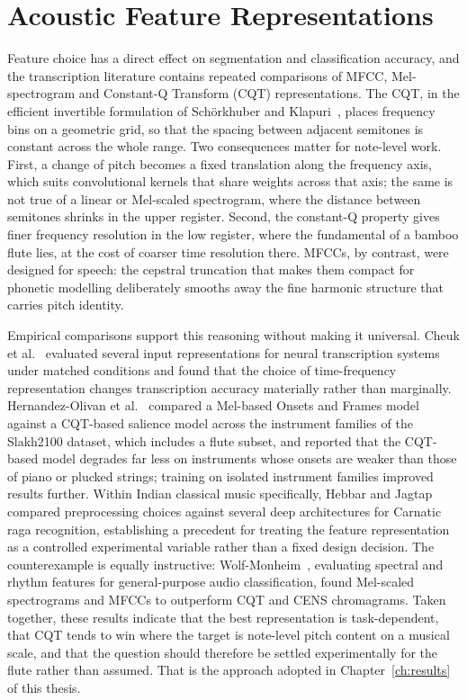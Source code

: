 \section{Acoustic Feature Representations}
\label{sec:features}

Feature choice has a direct effect on segmentation and classification accuracy, and the transcription literature contains repeated comparisons of MFCC, Mel-spectrogram and Constant-Q Transform (CQT) representations. The CQT, in the efficient invertible formulation of Sch\"{o}rkhuber and Klapuri~\cite{ref13}, places frequency bins on a geometric grid, so that the spacing between adjacent semitones is constant across the whole range. Two consequences matter for note-level work. First, a change of pitch becomes a fixed translation along the frequency axis, which suits convolutional kernels that share weights across that axis; the same is not true of a linear or Mel-scaled spectrogram, where the distance between semitones shrinks in the upper register. Second, the constant-Q property gives finer frequency resolution in the low register, where the fundamental of a bamboo flute lies, at the cost of coarser time resolution there. MFCCs, by contrast, were designed for speech: the cepstral truncation that makes them compact for phonetic modelling deliberately smooths away the fine harmonic structure that carries pitch identity.

Empirical comparisons support this reasoning without making it universal. Cheuk et al.~\cite{ref14} evaluated several input representations for neural transcription systems under matched conditions and found that the choice of time-frequency representation changes transcription accuracy materially rather than marginally. Hernandez-Olivan et al.~\cite{ref15} compared a Mel-based Onsets and Frames model against a CQT-based salience model across the instrument families of the Slakh2100 dataset, which includes a flute subset, and reported that the CQT-based model degrades far less on instruments whose onsets are weaker than those of piano or plucked strings; training on isolated instrument families improved results further. Within Indian classical music specifically, Hebbar and Jagtap~\cite{ref16} compared preprocessing choices against several deep architectures for Carnatic raga recognition, establishing a precedent for treating the feature representation as a controlled experimental variable rather than a fixed design decision. The counterexample is equally instructive: Wolf-Monheim~\cite{ref17}, evaluating spectral and rhythm features for general-purpose audio classification, found Mel-scaled spectrograms and MFCCs to outperform CQT and CENS chromagrams. Taken together, these results indicate that the best representation is task-dependent, that CQT tends to win where the target is note-level pitch content on a musical scale, and that the question should therefore be settled experimentally for the flute rather than assumed. That is the approach adopted in Chapter~\ref{ch:results} of this thesis.

